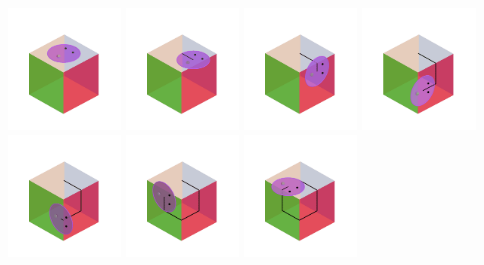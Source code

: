 \documentclass[14pt,aspectratio=169]{beamer}
\begin{document}
\begin{frame}
  \includegraphics[width=30mm]{figs/curved_cube/curved_cube-0}
  \includegraphics[width=30mm]{figs/curved_cube/curved_cube-10}
  \includegraphics[width=30mm]{figs/curved_cube/curved_cube-21}
  \includegraphics[width=30mm]{figs/curved_cube/curved_cube-41}
  \includegraphics[width=30mm]{figs/curved_cube/curved_cube-47}
  \includegraphics[width=30mm]{figs/curved_cube/curved_cube-70}
  \includegraphics[width=30mm]{figs/curved_cube/curved_cube-80}

\end{frame}
\end{document}
